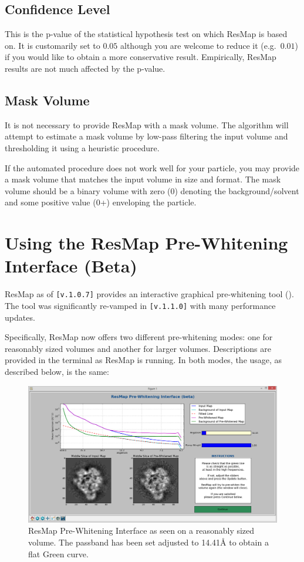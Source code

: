 \documentclass[10pt]{article}
\begin{document}
\subsection{Confidence Level}
This is the p-value of the statistical hypothesis test on which ResMap is based on. It is customarily set to $0.05$ although you are welcome to reduce it (e.g.~$0.01$) if you would like to obtain a more conservative result. Empirically, ResMap results are not much affected by the p-value.

\subsection{Mask Volume}
It is not necessary to provide ResMap with a mask volume. The algorithm will attempt to estimate a mask volume by low-pass filtering the input volume and thresholding it using a heuristic procedure.

If the automated procedure does not work well for your particle, you may provide a mask volume that matches the input volume in size and format. The mask volume should be a binary volume with zero (0) denoting the background/solvent and some positive value (0+) enveloping the particle.

\section{Using the ResMap Pre-Whitening Interface (Beta)}
ResMap as of \texttt{[v.1.0.7]} provides an interactive graphical pre-whitening tool (). The tool was significantly re-vamped in \texttt{[v.1.1.0]} with many performance updates.

Specifically, ResMap now offers two different pre-whitening modes: one for reasonably sized volumes and another for larger volumes. Descriptions are provided in the terminal as ResMap is running. In both modes, the usage, as described below, is the same:

\begin{figure}[!h]
\centering
\includegraphics[width=5in]{img/gui_preWhitening.png}
\caption{ResMap Pre-Whitening Interface as seen on a reasonably sized volume. The passband has been set adjusted to 14.41\AA{} to obtain a flat Green curve.}
\label{fig:prewhitening}
\end{figure}
\end{document}
